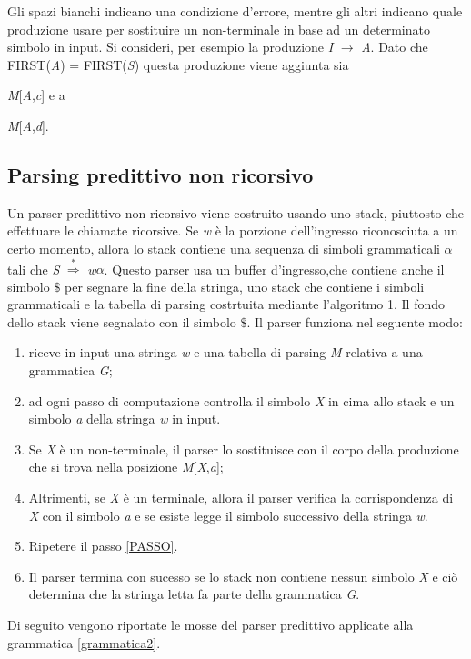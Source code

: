 Gli spazi bianchi indicano una condizione d'errore, mentre gli altri indicano quale produzione usare per sostituire un non-terminale in base ad un determinato simbolo in input. Si consideri, per esempio la produzione \textit{I} $\to$ \textit{A}. Dato che FIRST(\textit{A}) = FIRST(\textit{S}) questa produzione viene aggiunta sia {\textit{M}[\textit{A},\textit{c}] e a {\textit{M}[\textit{A},\textit{d}].
\subsection{Parsing predittivo non ricorsivo}
Un parser predittivo non ricorsivo \cite{libro: compilatori} viene costruito usando uno stack, piuttosto che effettuare le chiamate ricorsive. Se \textit{w} è la porzione dell'ingresso riconosciuta a un certo momento, allora lo stack contiene una sequenza di simboli grammaticali $\alpha$ tali che \textit{S} $\overset{*}{\Rightarrow}$ \textit{w}$\alpha$. Questo parser usa un buffer d'ingresso,che contiene anche il simbolo $\$$ per segnare la fine della stringa, uno stack che contiene i simboli grammaticali e la tabella di parsing costrtuita mediante l'algoritmo 1. Il fondo dello stack viene segnalato con il simbolo $\$$. Il parser funziona nel seguente modo:
\begin{enumerate}
	\item riceve in input una stringa \textit{w} e una tabella di parsing \textit{M} relativa a una grammatica \textit{G};
	\item \label{PASSO} ad ogni passo di computazione controlla il simbolo \textit{X} in cima allo stack e un simbolo \textit{a} della stringa \textit{w} in input.
	\item Se \textit{X} è un non-terminale, il parser lo sostituisce con il corpo della produzione che si trova nella posizione \textit{M}[\textit{X},\textit{a}];
	\item Altrimenti, se \textit{X} è un terminale, allora il parser verifica la corrispondenza di \textit{X} con il simbolo \textit{a} e se esiste legge il simbolo successivo della stringa \textit{w}.
	\item Ripetere il passo \ref{PASSO}.
	\item Il parser termina con sucesso se lo stack non contiene nessun simbolo \textit{X} e ciò determina che la stringa letta fa parte della grammatica \textit{G}.
\end{enumerate}
Di seguito vengono riportate le mosse del parser predittivo applicate alla grammatica \ref{grammatica2}.
\begin{table}[hbpb]

\end{table}}}

